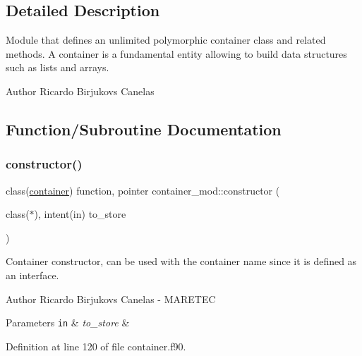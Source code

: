 \subsection{Detailed Description}
Module that defines an unlimited polymorphic container class and related methods. A container is a fundamental entity allowing to build data structures such as lists and arrays. 

\begin{DoxyAuthor}{Author}
Ricardo Birjukovs Canelas 
\end{DoxyAuthor}


\subsection{Function/\+Subroutine Documentation}
\mbox{\label{namespacecontainer__mod_a6262df4ff34024d566cf8261dc20a248}} 
\subsubsection{\texorpdfstring{constructor()}{constructor()}}
{\footnotesize\ttfamily class(\mbox{\hyperlink{structcontainer__mod_1_1container}{container}}) function, pointer container\+\_\+mod\+::constructor (\begin{DoxyParamCaption}\item[{class($\ast$), intent(in)}]{to\+\_\+store }\end{DoxyParamCaption})\hspace{0.3cm}{\ttfamily [private]}}



Container constructor, can be used with the \textquotesingle{}container\textquotesingle{} name since it is defined as an interface. 

\begin{DoxyAuthor}{Author}
Ricardo Birjukovs Canelas -\/ M\+A\+R\+E\+T\+EC 
\end{DoxyAuthor}

\begin{DoxyParams}[1]{Parameters}
\mbox{\tt in}  & {\em to\+\_\+store} & \\
\hline
\end{DoxyParams}


Definition at line 120 of file container.\+f90.


